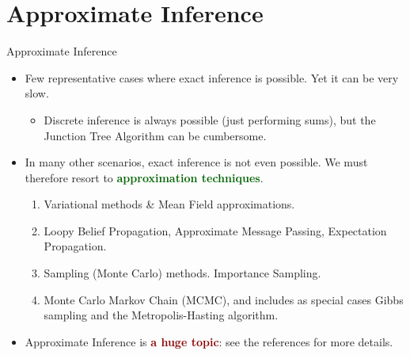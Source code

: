 \documentclass[10pt]{beamer}
\newcommand{\noteR}[1]{\textbf{\textcolor{darkred}{#1}}}
\newcommand{\noteG}[1]{\textbf{\textcolor{darkgreen}{#1}}}
\begin{document}
\section{Approximate Inference}

\begin{frame}{Approximate Inference}
\begin{itemize}
\item Few representative cases where exact inference is possible. Yet it can be very slow. 
\begin{itemize}
\item Discrete inference is always possible (just performing sums), but the Junction Tree Algorithm can be cumbersome.
\end{itemize}
\item In many other scenarios, exact inference is not even possible. We must therefore resort to \noteG{approximation techniques}.
\begin{enumerate}
\item Variational methods \& Mean Field approximations.
\item Loopy Belief Propagation, Approximate Message Passing, Expectation Propagation.
\item Sampling (Monte Carlo) methods. Importance Sampling.
\item Monte Carlo Markov Chain (MCMC), and includes as special cases Gibbs sampling and the Metropolis-Hasting algorithm.
\end{enumerate}
\item Approximate Inference is  \noteR{a huge topic}: see the references for more details. 
\end{itemize}
\end{frame}
\end{document}
